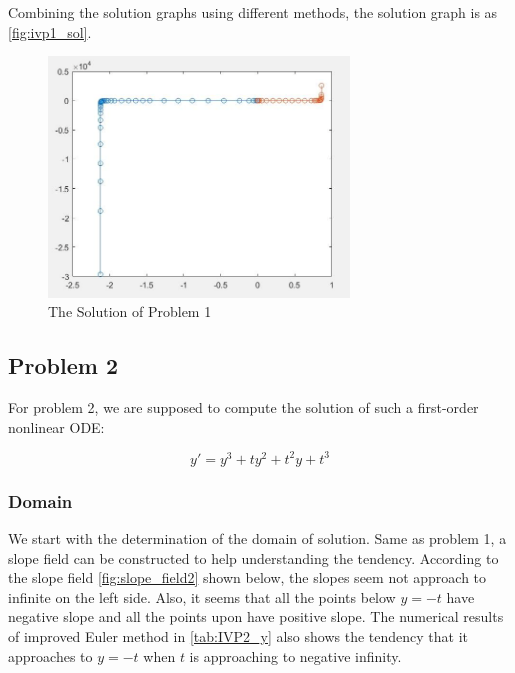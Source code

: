 \documentclass[a4paper]{article}
\begin{document}
	Combining the solution graphs using different methods, the solution graph is as \autoref{fig:ivp1_sol}.
	
	\begin{figure}[H]
		\centering
		\includegraphics[width=8cm]{img/ivp1_sol.png}
		\caption{\label{fig:ivp1_sol} The Solution of Problem 1}
	\end{figure}

	
	
	
	
	\subsection{Problem 2}
	
	For problem 2, we are supposed to compute the solution of such a first-order nonlinear ODE: 
	
	\begin{equation} \label{eq:ode2}
	    y' = y^3 + ty^2 + t^2y + t^3 \tag{ODE2}
	\end{equation}
	
	
	\subsubsection{Domain}
	
	We start with the determination of the domain of solution. Same as problem 1, a slope field can be constructed to help understanding the tendency. According to the slope field \autoref{fig:slope_field2} shown below, the slopes seem not approach to infinite on the left side. Also, it seems that all the points below $y= -t$ have negative slope and all the points upon have positive slope. The numerical results of improved Euler method in \autoref{tab:IVP2_y} also shows the tendency that it approaches to $y = -t$ when $t$ is approaching to negative infinity. 
	
\end{document}
